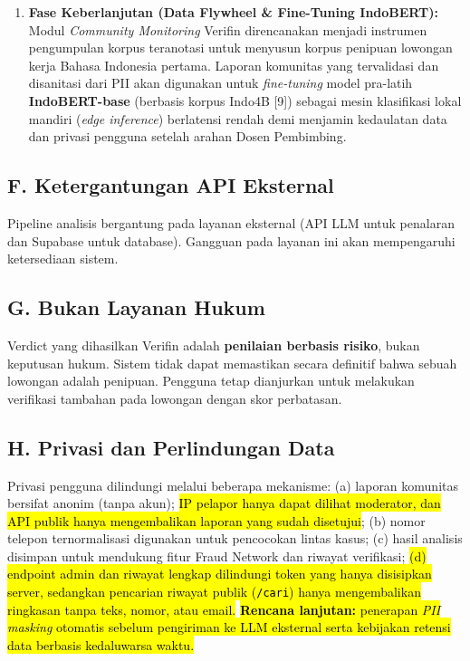 \documentclass[12pt,a4paper]{article}
\newcommand{\revisi}[1]{\hl{#1}}
\newenvironment{sorotkuning}{%
  \begin{tcolorbox}[
    breakable,
    enhanced,
    frame hidden,
    boxrule=0pt,
    arc=0mm,
    sharp corners,
    colback=yellow!22,
    left=1.5mm, right=1.5mm, top=1.0mm, bottom=1.0mm,
    before skip=1.5pt, after skip=1.5pt
  ]%
}{%
  \end{tcolorbox}%
}
\begin{document}
\begin{sorotkuning}
\begin{enumerate}[label=\textbf{\arabic*.}, start=2]
\item \textbf{Fase Keberlanjutan (Data Flywheel \& Fine-Tuning IndoBERT):} Modul \textit{Community Monitoring}
      Verifin direncanakan menjadi instrumen pengumpulan korpus teranotasi untuk menyusun
      korpus penipuan lowongan kerja Bahasa Indonesia pertama. Laporan komunitas yang tervalidasi dan
      disanitasi dari PII akan digunakan untuk \textit{fine-tuning} model pra-latih \textbf{IndoBERT-base}
      (berbasis korpus Indo4B [9]) sebagai mesin klasifikasi lokal mandiri (\textit{edge inference}) berlatensi
      rendah demi menjamin kedaulatan data dan privasi pengguna setelah arahan Dosen Pembimbing.
\end{enumerate}
\end{sorotkuning}

\subsection*{F. Ketergantungan API Eksternal}
Pipeline analisis bergantung pada layanan eksternal (API LLM untuk penalaran dan Supabase
untuk database). Gangguan pada layanan ini akan mempengaruhi ketersediaan sistem.

\subsection*{G. Bukan Layanan Hukum}
Verdict yang dihasilkan Verifin adalah \textbf{penilaian berbasis risiko}, bukan keputusan
hukum. Sistem tidak dapat memastikan secara definitif bahwa sebuah lowongan adalah penipuan.
Pengguna tetap dianjurkan untuk melakukan verifikasi tambahan pada lowongan dengan skor
perbatasan.

\subsection*{H. Privasi dan Perlindungan Data}
Privasi pengguna dilindungi melalui beberapa mekanisme: (a) laporan komunitas bersifat anonim
(tanpa akun); \revisi{IP pelapor hanya dapat dilihat moderator, dan API publik hanya mengembalikan laporan yang sudah disetujui};
(b) nomor telepon ternormalisasi digunakan untuk pencocokan lintas kasus; (c) hasil
analisis disimpan untuk mendukung fitur Fraud Network dan riwayat verifikasi; \revisi{(d) endpoint admin dan riwayat
lengkap dilindungi token yang hanya disisipkan server, sedangkan pencarian riwayat publik (\texttt{/cari}) hanya
mengembalikan ringkasan tanpa teks, nomor, atau email.} \revisi{\textbf{Rencana lanjutan:} penerapan \textit{PII masking} otomatis sebelum pengiriman ke LLM eksternal serta kebijakan retensi data berbasis kedaluwarsa waktu.}
\end{document}

